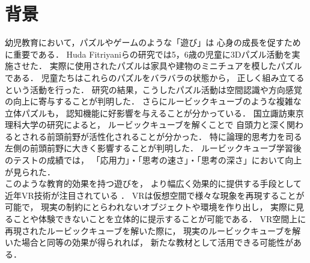 \section{背景}
  幼児教育において，パズルやゲームのような「遊び」は
  心身の成長を促すために重要である\cite{joy}．
  Huda Fitriyaniらの研究\cite{puzzle}では5，6歳の児童に3Dパズル活動を実施させた．
  実際に使用されたパズルは家具や建物のミニチュアを模したパズルである．
  児童たちはこれらのパズルをバラバラの状態から，
  正しく組み立てるという活動を行った．
  研究の結果，こうしたパズル活動は空間認識や方向感覚の向上に寄与することが判明した．
  さらにルービックキューブのような複雑な立体パズルも，
  認知機能に好影響を与えることが分かっている．
  国立諏訪東京理科大学の研究\cite{rubik}によると，
  ルービックキューブを解くことで
  自頭力と深く関わるとされる前頭前野が活性化されることが分かった．
  特に論理的思考力を司る左側の前頭前野に大きく影響することが判明した．
  ルービックキューブ学習後のテストの成績では，
  「応用力」・「思考の速さ」・「思考の深さ」において向上が見られた．
  \\\indent
  このような教育的効果を持つ遊びを，
  より幅広く効果的に提供する手段として近年VR技術が注目されている
  \cite{全天球}\cite{授業実践}．
  VRは仮想空間で様々な現象を再現することが可能で，
  現実の制約にとらわれないオブジェクトや環境を作り出し，
  実際に見ることや体験できないことを立体的に提示することが可能である．
  VR空間上に再現されたルービックキューブを解いた際に，
  現実のルービックキューブを解いた場合と同等の効果が得られれば，
  新たな教材として活用できる可能性がある．
